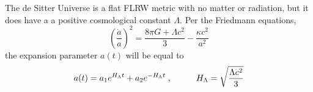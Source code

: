 The de Sitter Universe is a flat FLRW metric with no matter or radiation, but it does have a a positive cosmological constant $\Lambda$. Per the Friedmann equations,
\begin{equation}
	\left(\frac{\dot{a}}{a}\right)^2=\frac{8\pi G+\Lambda c^2}{3}-\frac{\kappa c^2}{a^2}
\end{equation}
the expansion parameter $a(t)$ will be equal to
\begin{equation}
	a(t)=a_1e^{H_\Lambda t}+a_2e^{-H_\Lambda t}\;,\hspace{1.0cm} H_\Lambda=\sqrt{\frac{\Lambda c^2}{3}}
\end{equation}
